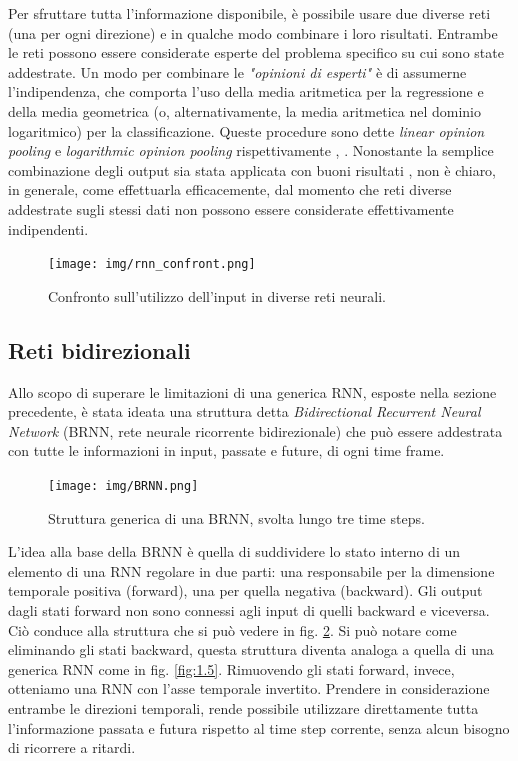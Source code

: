 Per sfruttare tutta l'informazione disponibile, è possibile usare due diverse reti (una per ogni direzione) e in qualche modo combinare i loro risultati. Entrambe le reti possono essere considerate esperte del problema specifico su cui sono state addestrate. Un modo per combinare le \textit{"opinioni di esperti"} è di assumerne l'indipendenza, che comporta l'uso della media aritmetica per la regressione e della media geometrica (o, alternativamente, la media aritmetica nel dominio logaritmico) per la classificazione. Queste procedure sono dette \textit{linear opinion pooling} e \textit{logarithmic opinion pooling} rispettivamente \cite{SDT}, \cite{combining}. Nonostante la semplice combinazione degli output sia stata applicata con buoni risultati \cite{phone1}, non è chiaro, in generale, come effettuarla efficacemente, dal momento che reti diverse addestrate sugli stessi dati non possono essere considerate effettivamente indipendenti.
\begin{figure}[ht]
	\centering
	\texttt{[image: img/rnn\_confront.png]}
	\caption{Confronto sull'utilizzo dell'input in diverse reti neurali.}
	\label{fig:1.10}
\end{figure}
\subsection{Reti bidirezionali}
Allo scopo di superare le limitazioni di una generica RNN, esposte nella sezione precedente, è stata ideata una struttura detta \textit{Bidirectional Recurrent Neural Network} (BRNN, rete neurale ricorrente bidirezionale) che può essere addestrata con tutte le informazioni in input, passate e future, di ogni time frame.
\begin{figure}[ht]
	\centering
	\texttt{[image: img/BRNN.png]}
	\caption{Struttura generica di una BRNN, svolta lungo tre time steps.}
	\label{fig:1.11}
\end{figure}

L'idea alla base della BRNN è quella di suddividere lo stato interno di un elemento di una RNN regolare in due parti: una responsabile per la dimensione temporale positiva (forward), una per quella negativa (backward). Gli output dagli stati forward non sono connessi agli input di quelli backward e viceversa. Ciò conduce alla struttura che si può vedere in fig. \ref{fig:1.11}.
Si può notare come eliminando gli stati backward, questa struttura diventa analoga a quella di una generica RNN come in fig. \ref{fig:1.5}. Rimuovendo gli stati forward, invece, otteniamo una RNN con l'asse temporale invertito. Prendere in considerazione entrambe le direzioni temporali, rende possibile utilizzare direttamente tutta l'informazione passata e futura rispetto al time step corrente, senza alcun bisogno di ricorrere a ritardi.

